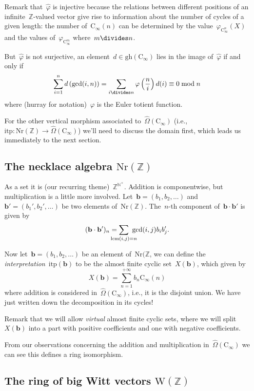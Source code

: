 Remark that~$\hat{\varphi}$ is injective because the relations between different positions of an infinite~$\mathbb{Z}$\nobreakdash-valued vector give rise to information about the number of cycles of a given length: the number of~$\mathrm{C}_\infty(n)$ can be determined by the value~$\varphi_{\mathrm{C}_\infty^n}(X)$ and the values of~$\varphi_{\mathrm{C}_\infty^m}$ where~$m\divides n$.

But~$\hat{\varphi}$ is not surjective, an element~$d\in\mathrm{gh}(\mathrm{C}_\infty)$ lies in the image of~$\hat{\varphi}$ if and only if
\begin{equation}
  \sum_{i=1}^nd\left( \gcd(i,n) \right)=\sum_{i\divides n}\varphi\left( \frac{n}{i} \right)d(i)\equiv 0\bmod n
\end{equation}
where (hurray for notation)~$\varphi$ is the Euler totient function.

For the other vertical morphism associated to~$\hat{\Omega}(\mathrm{C}_\infty)$ (i.e.,~$\mathrm{itp}\colon\mathrm{Nr}(\mathbb{Z})\to\hat{\Omega}(\mathrm{C}_\infty)$) we'll need to discuss the domain first, which leads us immediately to the next section.


\subsection{The necklace algebra $\mathrm{Nr}(\mathbb{Z})$}
As a set it is (our recurring theme)~$\mathbb{Z}^{\mathbb{N}^\times}$. Addition is componentwise, but multiplication is a little more involved. Let~$\mathbf{b}=(b_1,b_2,\ldots)$ and~$\mathbf{b}'=(b_1',b_2',\ldots)$ be two elements of~$\mathrm{Nr}(\mathbb{Z})$. The~$n$\nobreakdash-th component of~$\mathbf{b}\cdot\mathbf{b}'$ is given by
\begin{equation}
  (\mathbf{b}\cdot\mathbf{b}')_n=\sum_{\mathclap{\mathrm{lcm}(i,j)=n}}\ \gcd(i,j)b_ib_j'.
\end{equation}

Now let~$\mathbf{b}=(b_1,b_2,\ldots)$ be an element of~$\mathrm{Nr}(\mathbb{Z}$, we can define the \emph{interpretation}~$\mathrm{itp}(\mathbf{b})$ to be the almost finite cyclic set~$X(\mathbf{b})$, which given by
\begin{equation}
  X(\mathbf{b})=\sum_{n=1}^{+\infty}b_n\mathrm{C}_\infty(n)
\end{equation}
where addition is considered in~$\hat{\Omega}(\mathrm{C}_\infty)$, i.e., it is the disjoint union. We have just written down the decomposition in its cycles!

Remark that we will allow \emph{virtual} almost finite cyclic sets, where we will split~$X(\mathbf{b})$ into a part with positive coefficients and one with negative coefficients.

From our observations concerning the addition and multiplication in~$\hat{\Omega}(\mathrm{C}_\infty)$ we can see this defines a ring isomorphism.


\subsection{The ring of big Witt vectors $\mathrm{W}(\mathbb{Z})$}
